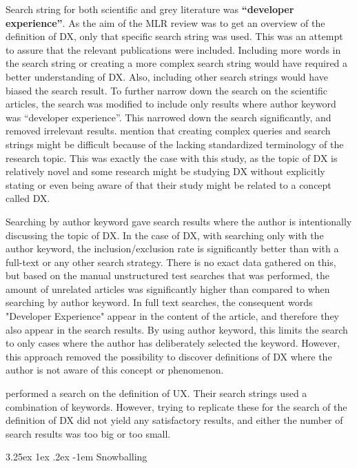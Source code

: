 \documentclass[english, 12pt, a4paper, sci, utf8, a-1b, online]{aaltothesis}
\makeatletter
\renewcommand\paragraph{\@startsection{paragraph}{5}{\z@}%
  {3.25ex \@plus1ex \@minus.2ex}%
  {-1em}%
  {\normalfont\normalsize\bfseries}}
\makeatother
\begin{document}
Search string for both scientific and grey literature was \textbf{``developer experience''}. As the aim of the MLR review was to get an overview of the definition of DX, only that specific search string was used. This was an attempt to assure that the relevant publications were included. Including more words in the search string or creating a more complex search string would have required a better understanding of DX. Also, including other search strings would have biased the search result. To further narrow down the search on the scientific articles, the search was modified to include only results where author keyword was ``developer experience''. This narrowed down the search significantly, and removed irrelevant results. \textcite{guidelines-for-snowballing} mention that creating complex queries and search strings might be difficult because of the lacking standardized terminology of the research topic. This was exactly the case with this study, as the topic of DX is relatively novel and some research might be studying DX without explicitly stating or even being aware of that their study might be related to a concept called DX.

Searching by author keyword gave search results where the author is intentionally discussing the topic of DX. In the case of DX, with searching only with the author keyword, the inclusion/exclusion rate is significantly better than with a full-text or any other search strategy. There is no exact data gathered on this, but based on the manual unstructured test searches that was performed, the amount of unrelated articles was significantly higher than compared to when searching by author keyword. In full text searches, the consequent words "Developer Experience" appear in the content of the article, and therefore they also appear in the search results. By using author keyword, this limits the search to only cases where the author has deliberately selected the keyword. However, this approach removed the possibility to discover definitions of DX where the author is not aware of this concept or phenomenon.

\textcite{understanding-ux} performed a search on the definition of UX. Their search strings used a combination of keywords. However, trying to replicate these for the search of the definition of DX did not yield any satisfactory results, and either the number of search results was too big or too small.

\paragraph{Snowballing}
\end{document}
